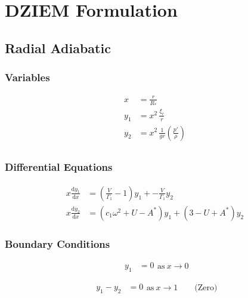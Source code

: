 \documentclass[fleqn]{article}
\newcommand{\diff}{\ensuremath{\mathrm{d}}}
\newcommand{\Vg}{\ensuremath{\frac{V}{\Gamma_{1}}}}
\newcommand{\As}{\ensuremath{A^{\ast}}}
\newcommand{\Rstar}{\ensuremath{R_{\ast}}}
\begin{document}

\section*{DZIEM Formulation}

\subsection*{Radial Adiabatic}

\subsubsection*{Variables}

\begin{align*}
x     &= \frac{r}{\Rstar} \\
y_{1} &= x^{2}\, \frac{\xi_{r}}{r} \\
y_{2} &= x^{2}\, \frac{1}{gr} \left( \frac{p'}{\rho} \right) \\
\end{align*}

\subsubsection*{Differential Equations}

\begin{align*}
x \frac{\diff y_{1}}{\diff x} &=
\left(\Vg - 1 \right) y_{1} +
- \Vg y_{2} \\
x \frac{\diff y_{2}}{\diff x} &=
(c_{1} \omega^{2} + U - \As ) y_{1} +
(3 - U + \As) y_{2}
\end{align*}

\subsubsection*{Boundary Conditions}

\begin{equation*}
\begin{aligned}
y_{1} &= 0
\end{aligned}
\text{as}\ x \rightarrow 0
\end{equation*}

\begin{equation*}
\begin{aligned}
y_{1} - y_{2} &= 0
\end{aligned}
\text{as}\ x \rightarrow 1 \qquad \text{(Zero)}
\end{equation*}
\end{document}
